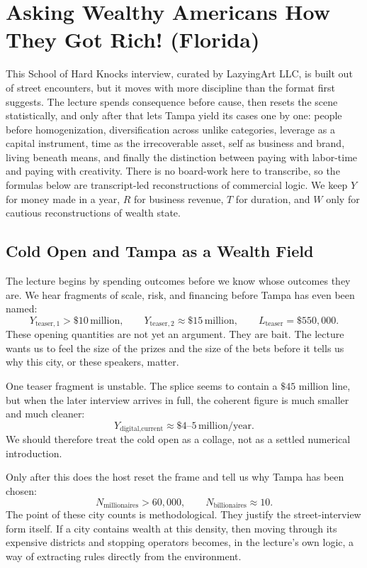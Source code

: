 \chapter{Asking Wealthy Americans How They Got Rich! (Florida)}

This School of Hard Knocks interview, curated by LazyingArt LLC, is built out of street encounters, but it moves with more discipline than the format first suggests. The lecture spends consequence before cause, then resets the scene statistically, and only after that lets Tampa yield its cases one by one: people before homogenization, diversification across unlike categories, leverage as a capital instrument, time as the irrecoverable asset, self as business and brand, living beneath means, and finally the distinction between paying with labor-time and paying with creativity. There is no board-work here to transcribe, so the formulas below are transcript-led reconstructions of commercial logic. We keep \(Y\) for money made in a year, \(R\) for business revenue, \(T\) for duration, and \(W\) only for cautious reconstructions of wealth state.

\section{Cold Open and Tampa as a Wealth Field}

The lecture begins by spending outcomes before we know whose outcomes they are. We hear fragments of scale, risk, and financing before Tampa has even been named:
\begin{equation}
Y_{\text{teaser},1} > \$10\,\text{million},\qquad
Y_{\text{teaser},2} \approx \$15\,\text{million},\qquad
L_{\text{teaser}} = \$550{,}000.
\end{equation}
These opening quantities are not yet an argument. They are bait. The lecture wants us to feel the size of the prizes and the size of the bets before it tells us why this city, or these speakers, matter.

One teaser fragment is unstable. The splice seems to contain a \(\$45\) million line, but when the later interview arrives in full, the coherent figure is much smaller and much cleaner:
\begin{equation}
Y_{\text{digital,current}} \approx \$4\text{--}5\,\text{million/year}.
\end{equation}
We should therefore treat the cold open as a collage, not as a settled numerical introduction.

Only after this does the host reset the frame and tell us why Tampa has been chosen:
\begin{equation}
N_{\text{millionaires}} > 60{,}000,\qquad
N_{\text{billionaires}} \approx 10.
\end{equation}
The point of these city counts is methodological. They justify the street-interview form itself. If a city contains wealth at this density, then moving through its expensive districts and stopping operators becomes, in the lecture's own logic, a way of extracting rules directly from the environment.

